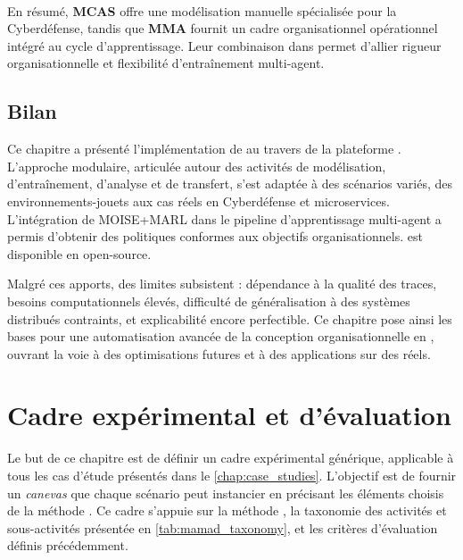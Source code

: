 \

En résumé, \textbf{MCAS} offre une modélisation manuelle spécialisée pour la Cyberdéfense, tandis que \textbf{MMA} fournit un cadre organisationnel opérationnel intégré au cycle d'apprentissage. Leur combinaison dans  permet d'allier rigueur organisationnelle et flexibilité d'entraînement multi-agent.


\section{Bilan}

Ce chapitre a présenté l'implémentation de  au travers de la plateforme . L'approche modulaire, articulée autour des activités de modélisation, d'entraînement, d'analyse et de transfert, s'est adaptée à des scénarios variés, des environnements-jouets aux cas réels en Cyberdéfense et microservices.
L'intégration de MOISE+MARL dans le pipeline d'apprentissage multi-agent a permis d'obtenir des politiques conformes aux objectifs organisationnels.  est disponible en open-source\footnotemark[1].

Malgré ces apports, des limites subsistent : dépendance à la qualité des traces, besoins computationnels élevés, difficulté de généralisation à des systèmes distribués contraints, et explicabilité encore perfectible. Ce chapitre pose ainsi les bases pour une automatisation avancée de la conception organisationnelle en , ouvrant la voie à des optimisations futures et à des applications sur des  réels.


\clearpage
\thispagestyle{empty}
\null
\newpage


\chapter{Cadre expérimental et d'évaluation}
\label{chap:cadre_experimental}

Le but de ce chapitre est de définir un cadre expérimental générique, applicable à tous les cas d'étude présentés dans le \autoref{chap:case_studies}. L'objectif est de fournir un \textit{canevas} que chaque scénario peut instancier en précisant les éléments choisis de la méthode . Ce cadre s'appuie sur la méthode , la taxonomie des activités et sous-activités présentée en \autoref{tab:mamad_taxonomy}, et les critères d'évaluation définis précédemment.

